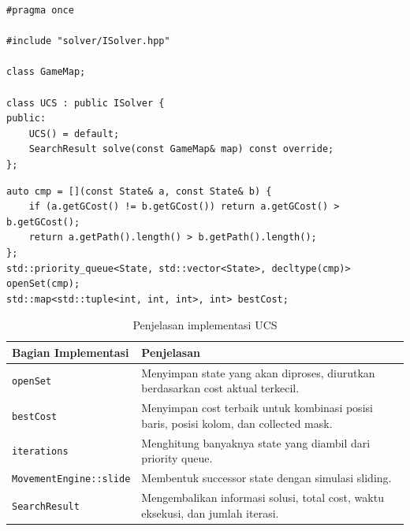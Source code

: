 \begin{tcolorbox}[
	colback=green!5,
	colframe=green!50!black,
	title=\textbf{Potongan Source Code Asli: Deklarasi \texttt{UCS.hpp}},
	arc=2mm,
	boxrule=0.8pt
]
\small
\begin{verbatim}
#pragma once

#include "solver/ISolver.hpp"

class GameMap;

class UCS : public ISolver {
public:
    UCS() = default;
    SearchResult solve(const GameMap& map) const override;
};
\end{verbatim}
\end{tcolorbox}

\begin{tcolorbox}[
	colback=green!5,
	colframe=green!50!black,
	title=\textbf{Potongan Source Code Asli: Prioritas dan Struktur Data UCS},
	arc=2mm,
	boxrule=0.8pt
]
\small
\begin{verbatim}
auto cmp = [](const State& a, const State& b) {
    if (a.getGCost() != b.getGCost()) return a.getGCost() > b.getGCost();
    return a.getPath().length() > b.getPath().length();
};
std::priority_queue<State, std::vector<State>, decltype(cmp)> openSet(cmp);
std::map<std::tuple<int, int, int>, int> bestCost;
\end{verbatim}
\end{tcolorbox}

\begin{table}[H]
	\centering
	\caption{Penjelasan implementasi UCS}
	\begin{tabular}{|p{4cm}|p{10cm}|}
		\hline
		\rowcolor{green!15}
		\textbf{Bagian Implementasi} & \textbf{Penjelasan} \\
		\hline
		\texttt{openSet} & Menyimpan state yang akan diproses, diurutkan berdasarkan cost aktual terkecil. \\
		\hline
		\texttt{bestCost} & Menyimpan cost terbaik untuk kombinasi posisi baris, posisi kolom, dan collected mask. \\
		\hline
		\texttt{iterations} & Menghitung banyaknya state yang diambil dari priority queue. \\
		\hline
		\texttt{MovementEngine::slide} & Membentuk successor state dengan simulasi sliding. \\
		\hline
		\texttt{SearchResult} & Mengembalikan informasi solusi, total cost, waktu eksekusi, dan jumlah iterasi. \\
		\hline
	\end{tabular}
\end{table}

